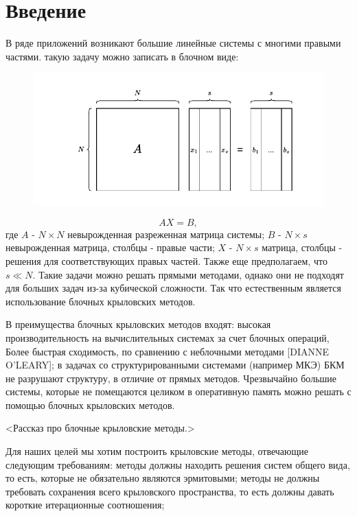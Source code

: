 \section{Введение}
\label{sec:Chapter0} 
В ряде приложений возникают большие линейные системы с многими правыми частями. такую задачу можно записать в блочном виде:\\
\begin{figure}[H]
    \centering
    \includegraphics[width=0.5\linewidth]{images/system.pdf}
    \label{fig:system}
\end{figure}
$$AX=B,$$
где $A$ - $N\times N$ невырожденная разреженная матрица системы;
$B$ - $N\times s$ невырожденная матрица, столбцы - правые части; 
$X$ - $N\times s$ матрица, столбцы - решения для соответствующих правых частей. 
Также еще предполагаем, что $s\ll N$.
Такие задачи можно решать прямыми методами, однако они не подходят для больших 
задач из-за кубической сложности. Так что естественным является использование 
блочных крыловских методов.\\

\par В преимущества блочных крыловских методов входят:
высокая производительность на вычислительных системах за счет блочных операций,
Более быстрая сходимость, по сравнению с неблочными методами [DIANNE O'LEARY]; 
в задачах со структурированными системами (например МКЭ) БКМ не разрушают структуру,
в отличие от прямых методов.
Чрезвычайно большие системы, которые не помещаются целиком в оперативную память 
можно решать с помощью блочных крыловских методов.\\
\par <Рассказ про блочные крыловские методы.>\\
\par Для наших целей мы хотим построить крыловские методы, отвечающие следующим требованиям: методы должны находить
решения систем общего вида, то есть, которые не обязательно являются эрмитовыми;
методы не должны требовать сохранения всего крыловского пространства, то есть должны 
давать короткие итерационные соотношения; 


\newpage
